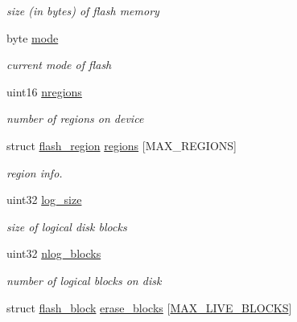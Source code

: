 \begin{DoxyCompactItemize}
\begin{DoxyCompactList}\small\item\em size (in bytes) of flash memory \end{DoxyCompactList}\item 
\mbox{\label{structflash_af9cc83d2e2ec4c398985b26e46c2a683}} 
byte \hyperlink{structflash_af9cc83d2e2ec4c398985b26e46c2a683}{mode}
\begin{DoxyCompactList}\small\item\em current mode of flash \end{DoxyCompactList}\item 
\mbox{\label{structflash_ac99fe0a8664d6f7faf46427f9cbaebff}} 
uint16 \hyperlink{structflash_ac99fe0a8664d6f7faf46427f9cbaebff}{nregions}
\begin{DoxyCompactList}\small\item\em number of regions on device \end{DoxyCompactList}\item 
struct \hyperlink{structflash__region}{flash\+\_\+region} \hyperlink{structflash_a07ad4035a0950608617ae37263272b6d}{regions} \mbox{[}M\+A\+X\+\_\+\+R\+E\+G\+I\+O\+NS\mbox{]}
\begin{DoxyCompactList}\small\item\em region info. \end{DoxyCompactList}\item 
\mbox{\label{structflash_a4f2e2d6773af895662fdcd960447f67c}} 
uint32 \hyperlink{structflash_a4f2e2d6773af895662fdcd960447f67c}{log\+\_\+size}
\begin{DoxyCompactList}\small\item\em size of logical disk blocks \end{DoxyCompactList}\item 
\mbox{\label{structflash_a26c3d3d516020c8159895ef989357cb7}} 
uint32 \hyperlink{structflash_a26c3d3d516020c8159895ef989357cb7}{nlog\+\_\+blocks}
\begin{DoxyCompactList}\small\item\em number of logical blocks on disk \end{DoxyCompactList}\item 
\mbox{\label{structflash_ad2c7622acd8164c1e59975d19afec942}} 
struct \hyperlink{structflash__block}{flash\+\_\+block} \hyperlink{structflash_ad2c7622acd8164c1e59975d19afec942}{erase\+\_\+blocks} \mbox{[}\hyperlink{flash_8h_acdca95641344ccf24c13430916c116da}{M\+A\+X\+\_\+\+L\+I\+V\+E\+\_\+\+B\+L\+O\+C\+KS}\mbox{]}

\end{DoxyCompactItemize}

